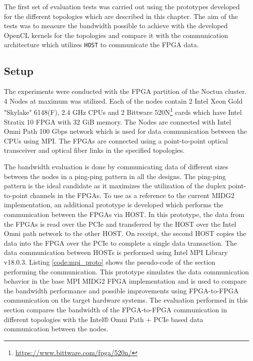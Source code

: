 The first set of evaluation tests was carried out using the prototypes
developed for the different topologies which are described in this chapter.
The aim of the tests was to measure the bandwidth possible to achieve with the
developed OpenCL kernels for the topologies and compare it with the
communication architecture which utilizes \texttt{HOST} to communicate the
FPGA data.

\subsection{Setup}

The experiments were conducted with the FPGA partition of the Noctua
cluster. 4 Nodes at maximum was utilized. Each of the nodes
contain 2 Intel Xeon Gold "Skylake" 6148(F), 2.4 GHz CPUs and
2 Bittware 520N\footnote{\url{https://www.bittware.com/fpga/520n/}}
cards which have Intel Stratix 10 FPGA with 32 GiB memory. The Nodes
are connected with Intel Omni Path 100 Gbps network which is used
for data communication between the CPUs using MPI. The FPGAs
are connected using a point-to-point optical transceiver and
optical fiber links in the specified topologies.

The bandwidth evaluation is done by communicating data of different
sizes between the nodes in a ping-ping pattern in all the designs.
The ping-ping pattern is the ideal candidate as it maximizes
the utilization of the duplex point-to-point channels in the
FPGAs. To use as a reference to the current MIDG2 implementation,
an additional prototype is developed which performs the communication
between the FPGAs via HOST. In this prototype, the data from the FPGAs
is read over the PCIe and transferred by the HOST over the Intel
Omni path network to the other HOST. On receipt, the second HOST
copies the data into the FPGA over the PCIe to complete a single data
transaction. The data communication between HOSTs is performed using
Intel MPI Library v18.0.3. Listing \ref{code:mpi_proto} shows the pseudo-code of the section
performing the communication. This prototype simulates the data communication
behavior in the base MPI MIDG2 FPGA implementation and is used to compare the
bandwidth performance and possible improvements using FPGA-to-FPGA communication
on the target hardware systems. The evaluation performed in this
section compares the bandwidth of the FPGA-to-FPGA communication
in  different topologies with the Intel® Omni Path + PCIe based
data communication between the nodes.

